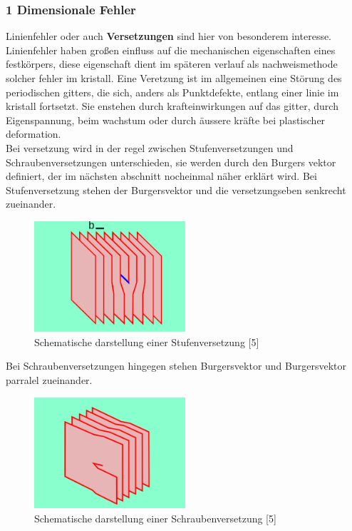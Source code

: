         \subsubsection*{1 Dimensionale Fehler}
            Linienfehler oder auch \textbf{Versetzungen} sind hier von besonderem interesse. Linienfehler haben 
            großen einfluss auf die mechanischen eigenschaften eines festkörpers, diese eigenschaft dient im späteren verlauf
            als nachweismethode solcher fehler im kristall. Eine Veretzung ist im allgemeinen eine Störung des periodischen gitters, 
            die sich, anders als Punktdefekte, entlang einer linie im kristall fortsetzt. Sie enstehen durch krafteinwirkungen auf das gitter,
            durch Eigenspannung, beim wachstum oder durch äussere kräfte bei plastischer deformation.\\
            Bei versetzung wird in der regel zwischen Stufenversetzungen und Schraubenversetzungen unterschieden,
            sie werden durch den Burgers vektor definiert, der im nächsten abschnitt nocheinmal näher erklärt wird.
            Bei Stufenversetzung stehen der Burgersvektor und die versetzungseben senkrecht zueinander.
            \begin{figure}[H]
                \centering
                \includegraphics[width=0.5\textwidth]{Images/Stufenversetzung.png}
                \caption{Schematische darstellung einer Stufenversetzung [5]}
            \end{figure}
            Bei Schraubenversetzungen hingegen stehen Burgersvektor und Burgersvektor parralel zueinander.
            \begin{figure}[H]
                \centering
                \includegraphics[width=0.5\textwidth]{Images/Schraubenversetzung.png}
                \caption{Schematische darstellung einer Schraubenversetzung [5]}
            \end{figure}
